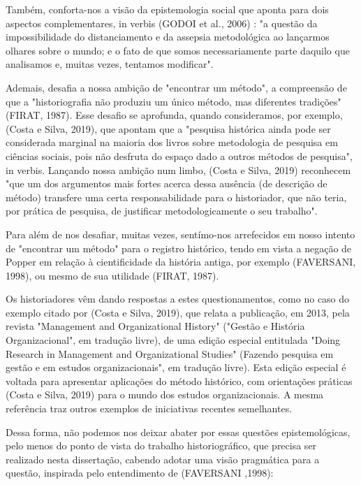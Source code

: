 Também, conforta-nos a visão da epistemologia social que aponta para dois aspectos complementares, in verbis (GODOI et al., 2006) : "a questão da impossibilidade do distanciamento e da assepsia metodológica ao lançarmos olhares sobre o mundo; e o fato de que somos necessariamente parte daquilo que analisamos e, muitas vezes, tentamos modificar".

Ademais, desafia a nossa ambição de "encontrar um método", a compreensão de que a "historiografia não produziu um único método, mas diferentes tradições" (FIRAT, 1987).  Esse desafio se aprofunda, quando consideramos, por exemplo, (Costa e Silva, 2019), que apontam que a "pesquisa histórica ainda pode ser considerada marginal na maioria dos livros sobre metodologia de pesquisa em ciências sociais, pois não desfruta do espaço dado a outros métodos de pesquisa", in verbis. Lançando nossa ambição num limbo,  (Costa e Silva, 2019) reconhecem "que um dos argumentos mais fortes acerca dessa ausência (de descrição de método) transfere uma certa responsabilidade para o historiador, que não teria, por prática de pesquisa, de justificar metodologicamente o seu trabalho".

Para além de nos desafiar, muitas vezes, sentímo-nos arrefecidos em nosso intento de "encontrar um método" para o registro histórico, tendo em vista a negação de Popper em relação à cientificidade da história antiga, por exemplo (FAVERSANI, 1998), ou mesmo de sua utilidade (FIRAT, 1987).

Os historiadores vêm dando respostas a estes questionamentos, como no caso do exemplo citado por  (Costa e Silva, 2019), que relata a publicação, em 2013, pela revista "Management and Organizational History" ("Gestão e História Organizacional", em tradução livre), de uma edição especial entitulada "Doing Research in Management and Organizational Studies" (Fazendo pesquisa em gestão e em estudos organizacionais", em tradução livre). Esta edição especial é voltada para apresentar aplicações do método histórico, com orientações práticas (Costa e Silva, 2019) para o mundo dos estudos organizacionais. A mesma referência traz outros exemplos de iniciativas recentes semelhantes.

Dessa forma, não podemos nos deixar abater por essas questões epistemológicas, pelo menos do ponto de vista do trabalho historiográfico, que precisa ser realizado nesta dissertação, cabendo adotar uma visão pragmática para a questão, inspirada pelo entendimento de (FAVERSANI ,1998):


